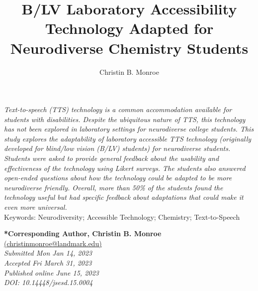 \documentclass[11.5pt]{sig-alternate}
\makeatletter
\let\oldabstract\abstract
\let\oldendabstract\endabstract
\renewenvironment{abstract}
{\renewenvironment{quotation}%
               {\list{}{\addtolength{\leftmargin}{1em} %
                        \listparindent 1.5em%
                        \itemindent    \listparindent%
                        \rightmargin   \leftmargin%
                        \parsep        \z@ \@plus\p@}%
                \item\relax}%
               {\endlist}%
\oldabstract}
{\oldendabstract}
\makeatother
\begin{document}
\title{B/LV Laboratory Accessibility Technology Adapted for Neurodiverse Chemistry Students}

\author[1]{\large \color{blue} Christin B. Monroe}



\toappear{}

\maketitle
\begin{@twocolumnfalse} 
\begin{abstract}
\item 
\begin{large}
 \textit{Text-to-speech (TTS) technology is a common accommodation available for students with disabilities. Despite the ubiquitous nature of TTS, this technology has not been explored in laboratory settings for neurodiverse college students. This study explores the adaptability of laboratory accessible TTS technology (originally developed for blind/low vision (B/LV) students) for neurodiverse students. Students were asked to provide general feedback about the usability and effectiveness of the technology using Likert surveys. The students also answered open-ended questions about how the technology could be adapted to be more neurodiverse friendly. Overall, more than 50\% of the students found the technology useful but had specific feedback about adaptations that could make it even more universal.}\\
 

   
     
     Keywords: Neurodiversity; Accessible Technology; Chemistry; Text-to-Speech
 \end{large}     
\end{abstract}
\end{@twocolumnfalse}




\textbf{*Corresponding Author, Christin B. Monroe}\\
\href{mailto: christinmonroe@landmark.edu}{(christinmonroe@landmark.edu)} \\
\textit{Submitted Mon Jan 14, 2023}\\
\textit{Accepted Fri March 31, 2023} \\
\textit{Published online June 15, 2023} \\
\textit{DOI: 10.14448/jsesd.15.0004} \\
\end{document}
